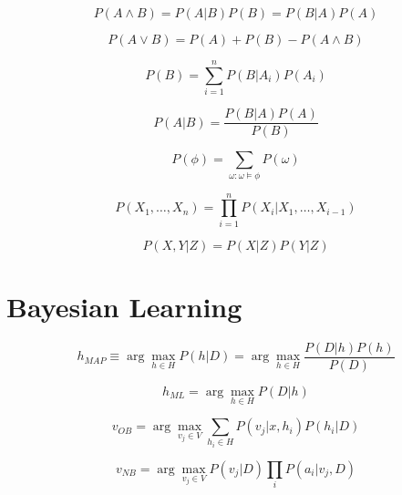 \documentclass{article}
\begin{document}
\begin{equation}
    P(A \wedge B) = P(A|B)P(B) = P(B|A)P(A)
\end{equation}

\begin{equation}
    P(A \vee B) = P(A) + P(B) - P(A \wedge B)
\end{equation}

\begin{equation}
    P(B) = \sum_{i=1}^n P(B|A_i)P(A_i)
\end{equation}

\begin{equation}
    P(A|B) = \frac{P(B|A)P(A)}{P(B)}
\end{equation}

\begin{equation}
    P(\phi) = \sum_{\omega : \omega \models \phi} P(\omega)
\end{equation}

\begin{equation}
    P(X_1, \ldots, X_n) = \prod_{i=1}^n P(X_i | X_1, \ldots, X_{i-1})
\end{equation}

\begin{equation}
    P(X, Y | Z) = P(X|Z)P(Y|Z)
\end{equation}


\section{Bayesian Learning}

\begin{equation}
    h_{MAP} \equiv \arg\max_{h \in H} P(h|D) = \arg\max_{h \in H} \frac{P(D|h)P(h)}{P(D)}
\end{equation}

\begin{equation}
    h_{ML} = \arg\max_{h \in H} P(D|h)
\end{equation}

\begin{equation}
    v_{OB} = \arg\max_{v_j \in V} \sum_{h_i \in H} P(v_j | x, h_i) P(h_i | D)
\end{equation}

\begin{equation}
    v_{NB} = \arg\max_{v_j \in V} P(v_j | D) \prod_i P(a_i | v_j, D)
\end{equation}
\end{document}
